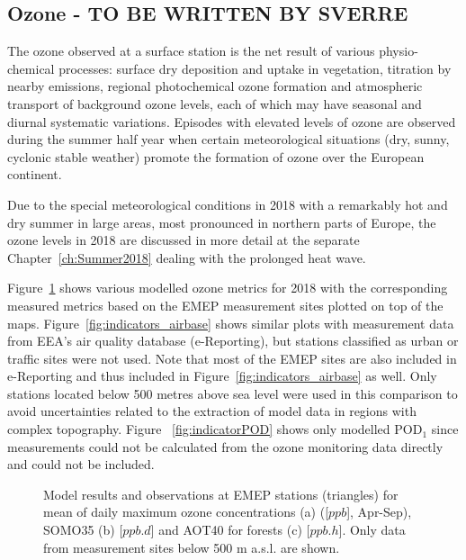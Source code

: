 \subsection{Ozone - TO BE WRITTEN BY SVERRE}
\label{O3MAX}

The ozone observed at a surface station is the net result of various physio-chemical processes: surface dry deposition and uptake in vegetation, titration by nearby \nox emissions, regional photochemical ozone formation and atmospheric transport of background ozone levels, each of which may have seasonal and diurnal systematic variations. Episodes with elevated levels of ozone are observed during the summer half year when certain meteorological situations (dry, sunny, cyclonic stable weather) promote the formation of ozone over the European continent. 

Due to the special meteorological conditions in 2018 with a remarkably hot and dry summer in large areas, most pronounced in northern parts of Europe, the ozone levels in 2018 are discussed in more detail at the separate Chapter~\ref{ch:Summer2018} dealing with the prolonged heat wave.

Figure~\ref{fig:indicators_emep} shows various modelled ozone metrics for 2018 with the corresponding measured metrics based on the EMEP measurement sites plotted on top of the maps. Figure~\ref{fig:indicators_airbase} shows similar plots with measurement data from EEA's air quality database (e-Reporting), but stations classified as urban or traffic sites were not used. Note that most of the EMEP sites are also included in e-Reporting and thus included in Figure~\ref{fig:indicators_airbase} as well. Only stations located below 500 metres above sea level were used in this comparison to avoid uncertainties related to the extraction of model data in regions with complex topography. Figure
~\ref{fig:indicatorPOD} shows only modelled POD$_1$ since measurements could not be calculated from the ozone monitoring data directly and could not be included.

\begin{figure}[H]
  \centering
\caption{Model results and observations at EMEP stations (triangles) for mean of daily maximum ozone concentrations (a) ([$ppb$], Apr-Sep), SOMO35 (b) [$ppb.d$] and AOT40 for forests (c) [$ppb.h$]. Only data from measurement sites below 500 m a.s.l. are shown.}
\label{fig:indicators_emep}
\end{figure}

